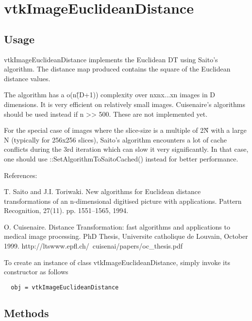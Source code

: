 \section{vtkImageEuclideanDistance}

\subsection{Usage}

 vtkImageEuclideanDistance implements the Euclidean DT using
 Saito's algorithm. The distance map produced contains the square of the
 Euclidean distance values. 

 The algorithm has a o(n\^(D+1)) complexity over nxnx...xn images in D 
 dimensions. It is very efficient on relatively small images. Cuisenaire's
 algorithms should be used instead if n >> 500. These are not implemented
 yet.

 For the special case of images where the slice-size is a multiple of 
 2\^N with a large N (typically for 256x256 slices), Saito's algorithm 
 encounters a lot of cache conflicts during the 3rd iteration which can 
 slow it very significantly. In that case, one should use 
 ::SetAlgorithmToSaitoCached() instead for better performance. 

 References:

 T. Saito and J.I. Toriwaki. New algorithms for Euclidean distance 
 transformations of an n-dimensional digitised picture with applications.
 Pattern Recognition, 27(11). pp. 1551--1565, 1994. 
 
 O. Cuisenaire. Distance Transformation: fast algorithms and applications
 to medical image processing. PhD Thesis, Universite catholique de Louvain,
 October 1999. http://ltswww.epfl.ch/~cuisenai/papers/oc\_thesis.pdf 

To create an instance of class vtkImageEuclideanDistance, simply
invoke its constructor as follows
\begin{verbatim}
  obj = vtkImageEuclideanDistance
\end{verbatim}
\subsection{Methods}

